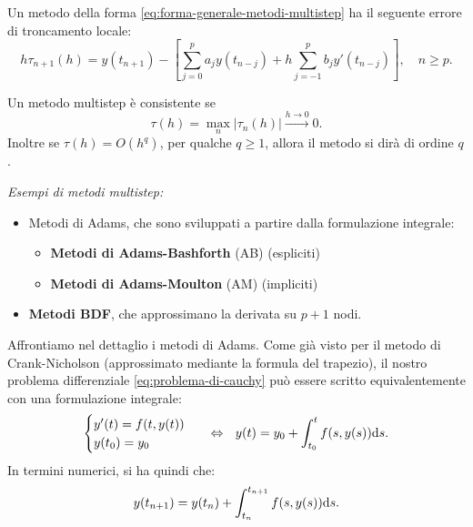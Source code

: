 \begin{definition}
Un metodo della forma \eqref{eq:forma-generale-metodi-multistep} ha il seguente errore di troncamento locale:
\begin{equation*}
h\tau _{n+1}(h) =y( t_{n+1}) -\left[\sum\limits ^{p}_{j=0} a_{j} y( t_{n-j}) +h\sum\limits ^{p}_{j=-1} b_{j} y'( t_{n-j})\right] ,\quad n\geqslant p.
\end{equation*}
\end{definition}

\begin{definition}
[Consistenza]
Un metodo multistep è consistente se
\begin{equation*}
\tau (h) =\max_{n}| \tau _{n}(h)| \xrightarrow{h\rightarrow 0} 0.
\end{equation*}
Inoltre se $\tau (h) =O\left( h^{q}\right)$, per qualche $q\geqslant 1$, allora il metodo si dirà di ordine $q$.
\end{definition}
\textit{Esempi di metodi multistep:}
\begin{itemize}
\item Metodi di Adams, che sono sviluppati a partire dalla formulazione integrale:
\begin{itemize}
\item \textbf{Metodi di Adams-Bashforth} (AB) (espliciti)
\item \textbf{Metodi di Adams-Moulton} (AM) (impliciti)
\end{itemize}
\item \textbf{Metodi BDF}, che approssimano la derivata su $p+1$ nodi.
\end{itemize}

Affrontiamo nel dettaglio i metodi di Adams.
Come già visto per il metodo di Crank-Nicholson (approssimato mediante la formula del trapezio), il nostro problema differenziale \eqref{eq:problema-di-cauchy} può essere scritto equivalentemente con una formulazione integrale:
\begin{equation*}
\begin{cases}
	y'(t) =f( t,y(t))\\
	y( t_{0}) =y_{0}
\end{cases} \ \ \Leftrightarrow \ \ y(t) =y_{0} +\int\nolimits ^{t}_{t_{0}} f( s,y(s)) \mathrm d s.
\end{equation*}
In termini numerici, si ha quindi che:
\begin{equation}
y( t_{n+1}) =y( t_{n}) +\int\nolimits ^{t_{n+1}}_{t_{n}} f( s,y(s)) \mathrm d s.
\label{eq:metodi-adams}
\end{equation}

